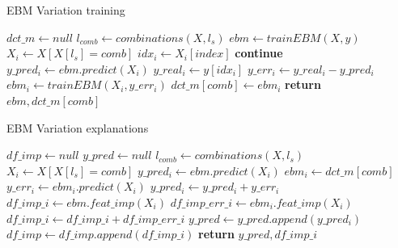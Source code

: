 \begin{algorithm}[h!]
\caption{EBM Variation training}\label{alg:annex-ebm-variation-train}
\begin{algorithmic}[1]
    \State $dct\_m \gets null$
    \State $l_{comb} \gets combinations(X, l_s)$
    \State $ebm \gets trainEBM(X, y)$
        \State $X_i \gets X[X[l_s]=comb]$
        \State $idx_i \gets X_i[index]$
            \State \textbf{continue}
        \EndIf
        \State $y\_pred_i \gets ebm.predict(X_i)$
        \State $y\_real_i \gets y[idx_i]$
        \State $y\_err_i \gets y\_real_i - y\_pred_i$
        \State $ebm_i \gets trainEBM(X_i, y\_err_i)$
        \State $dct\_m[comb] \gets ebm_i$
    \EndFor
    \State \textbf{return} $ebm, dct\_m[comb]$
\EndProcedure
\end{algorithmic}
\end{algorithm}


\begin{algorithm}[h!]
\caption{EBM Variation explanations}\label{alg:annex-ebm-variation-exp}
\begin{algorithmic}[1]
    \State $df\_imp \gets null$
    \State $y\_pred \gets null$
    \State $l_{comb} \gets combinations(X, l_s)$
        \State $X_i \gets X[X[l_s]=comb]$
        \State $y\_pred_i \gets ebm.predict(X_i)$
            \State $ebm_i \gets dct\_m[comb]$
            \State $y\_err_i \gets ebm_i.predict(X_i)$
            \State $y\_pred_i \gets y\_pred_i + y\_err_i$
            \State $df\_imp\_i \gets ebm.feat\_imp(X_i)$
            \State $df\_imp\_err\_i \gets ebm_i.feat\_imp(X_i)$
            \State $df\_imp\_i \gets df\_imp\_i + df\_imp\_err\_i$
        \EndIf
        \State $y\_pred \gets y\_pred.append(y\_pred_i)$
        \State $df\_imp \gets df\_imp.append(df\_imp\_i)$
    \EndFor
    \State \textbf{return} $y\_pred, df\_imp\_i$
\EndProcedure
\end{algorithmic}
\end{algorithm}


\newpage
